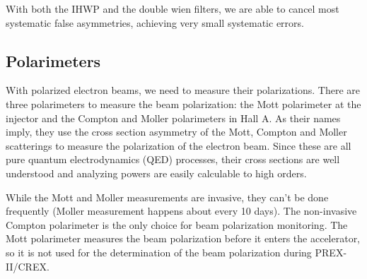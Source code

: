 With both the IHWP and the double wien filters, we are able to cancel most 
systematic false asymmetries, achieving very small systematic errors.
\begin{comment}
    IHWP
    \begin{itemize}
	\item Cancels electronic cross talk and Pockels Cell steering
	\item  Residual linear polarization effects do not cancel
	\item Spot size asymmetry, which we cannot measure, does not cancel
    \end{itemize}

    Wine filters and solenoid
    \begin{itemize}
	\item Cancels all helicity-correlated beam asymmetries from Injector including spot size
    \end{itemize}
\end{comment}

\subsection{Polarimeters}
With polarized electron beams, we need to measure their polarizations.
There are three polarimeters to measure the beam polarization: the Mott polarimeter
at the injector and the Compton and Moller polarimeters in Hall A. As their names
imply, they use the cross section asymmetry of the Mott, Compton and Moller
scatterings to measure the polarization of the electron beam. Since these are
all pure quantum electrodynamics (QED) processes, their cross sections are 
well understood and analyzing powers are easily calculable to high orders.

While the Mott and Moller measurements are invasive, they can't be done frequently
(Moller measurement happens about every 10 days).
The non-invasive Compton polarimeter is the only choice for beam polarization monitoring. 
The Mott polarimeter measures the beam polarization before it enters the accelerator, 
so it is not used for the determination of the beam polarization during PREX-II/CREX.

